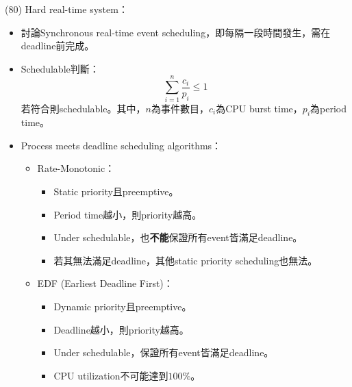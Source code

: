 \begin{theorem}{(80)} Hard real-time system：\begin{itemize}
        \item 討論Synchronous real-time event scheduling，即每隔一段時間發生，需在deadline前完成。
        \item Schedulable判斷：\begin{equation}
            \sum_{i = 1}^{n} \frac{c_i}{p_i} \le 1
        \end{equation} 若符合則schedulable。其中，$n$為事件數目，$c_i$為CPU burst time，$p_i$為period time。
        \item Process meets deadline scheduling algorithms：\begin{itemize}
            \item Rate-Monotonic：\begin{itemize}
                \item Static priority且preemptive。
                \item Period time越小，則priority越高。
                \item Under schedulable，也\textbf{不能}保證所有event皆滿足deadline。
                \item 若其無法滿足deadline，其他static priority scheduling也無法。
            \end{itemize}
            \item EDF (Earliest Deadline First)：\begin{itemize}
                \item Dynamic priority且preemptive。
                \item Deadline越小，則priority越高。
                \item Under schedulable，保證所有event皆滿足deadline。
                \item CPU utilization不可能達到$100\%$。
            \end{itemize}
        \end{itemize}
    \end{itemize}
\end{theorem}

